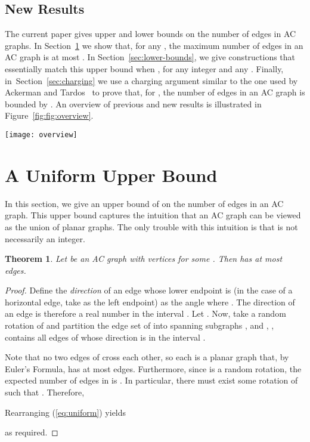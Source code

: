 \documentclass{patmorin}
\newcommand{\seclabel}[1]{\label{sec:#1}}
\newcommand{\secref}[1]{\mbox{Section~\ref{sec:#1}}}
\newcommand{\figlabel}[1]{\label{fig:#1}}
\newcommand{\figref}[1]{\mbox{Figure~\ref{fig:#1}}}
\newcommand{\eqref}[1]{(\ref{eq:#1})}
\newtheorem{thm}{Theorem}
\newcommand{\thmlabel}[1]{\label{thm:#1}}
\begin{document}
\subsection{New Results}

The current paper gives upper and lower bounds on the number of edges in
AC graphs.  In \secref{uniform} we show that, for any , the maximum number of edges in an AC graph is at most
.  In \secref{lower-bounds}, we give constructions that
essentially match this upper bound when , for
any integer  and any .  Finally, in~\secref{charging} we use
a charging argument similar to the one used by
Ackerman and Tardos~\cite{at-mneqp-07} to prove that, for
, the number of edges in an AC graph is
bounded by .
An overview of previous and new results is illustrated in \figref{fig:overview}.
\begin{figure*}[tbh]
  \begin{center}
    \texttt{[image: overview]}
  \end{center}
  \caption{A plot of previous and new upper and lower bounds. Lower order terms are disregarded.}
  \figlabel{fig:overview}
\end{figure*}

\section{A Uniform Upper Bound}
\seclabel{uniform}

In this section, we give an upper bound of  on the
number of edges in an AC graph.
This upper bound captures the intuition that an AC graph can be viewed as the union of 
planar graphs. The only trouble with this intuition is that 
is not necessarily an integer.

\begin{thm}\thmlabel{uniform-upper-bound}
Let  be an AC graph with  vertices for some .
Then  has at most  edges.
\end{thm}

\begin{proof}
Define the \emph{direction} of an edge  whose lower endpoint is  (in
the case of a horizontal edge, take  as the left endpoint) as the angle 
 where . The direction of an edge  is
therefore a real number in the interval . Let . 
Now, take a random rotation  of  and partition the edge set of  
into spanning subgraphs , and , ,
contains all edges of  whose direction is in the interval .

Note that no two edges of  cross each other, so each  is
a planar graph that, by Euler's Formula, has at most  edges.
Furthermore, since  is a random rotation, the expected number of
edges in  is .
In particular, there must exist some rotation  of  such that .
Therefore,

Rearranging \eqref{uniform} yields

as required.
\end{proof}
\end{document}
